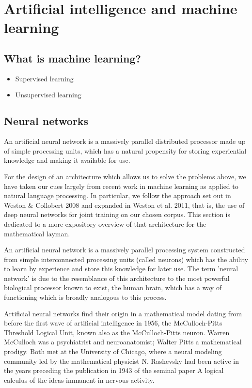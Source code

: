 \section{Artificial intelligence and machine learning}
\label{sec:aiml}

\subsection{What is machine learning?}
\label{sec:statistics}
\begin{itemize}
\item Supervised learning
\item Unsupervised learning
\end{itemize}

\subsection{Neural networks}
\label{sec:neuralnetworks}

An artificial neural network is a massively parallel distributed
processor made up of simple processing units, which has a natural
propensity for storing experiential knowledge and making it available
for use.

For the design of an architecture which allows us to solve the
problems above, we have taken our cues largely from recent work in
machine learning as applied to natural language processing. In
particular, we follow the approach set out in Weston \& Collobert 2008
and expanded in Weston et al. 2011, that is, the use of deep neural
networks for joint training on our chosen corpus. This section is
dedicated to a more expository overview of that architecture for the
mathematical layman.

An artificial neural network is a massively parallel processing system
constructed from simple interconnected processing units (called
neurons) which has the ability to learn by experience and store this
knowledge for later use. The term 'neural network' is due to the
resemblance of this architecture to the most powerful biological
processor known to exist, the human brain, which has a way of
functioning which is broadly analogous to this process. 

Artificial neural networks find their origin in a mathematical model
dating from before the first wave of artificial intelligence in 1956,
the McCulloch-Pitts Threshold Logical Unit, known also as the
McCulloch-Pitts neuron. Warren McCulloch was a psychiatrist and
neuroanatomist; Walter Pitts a mathematical prodigy. Both met at the
University of Chicago, where a neural modeling community led by the
mathematical physicist N. Rashevsky had been active in the years
preceding the publication in 1943 of the seminal paper A logical
calculus of the ideas immanent in nervous activity. 

